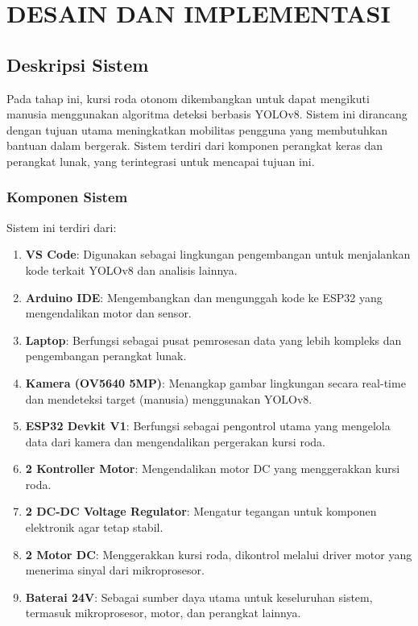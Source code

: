\chapter{DESAIN DAN IMPLEMENTASI}
\label{chap:desainimplementasi}


\section{Deskripsi Sistem}
\label{sec:deskripsisistem}

Pada tahap ini, kursi roda otonom dikembangkan untuk dapat mengikuti manusia menggunakan algoritma deteksi berbasis YOLOv8. Sistem ini dirancang dengan tujuan utama meningkatkan mobilitas pengguna yang membutuhkan bantuan dalam bergerak. Sistem terdiri dari komponen perangkat keras dan perangkat lunak, yang terintegrasi untuk mencapai tujuan ini.

\subsection{Komponen Sistem}
\label{subsec:komponensistem}

Sistem ini terdiri dari:

\begin{enumerate}[nolistsep]
    \item \textbf{VS Code}: Digunakan sebagai lingkungan pengembangan untuk menjalankan kode terkait YOLOv8 dan analisis lainnya.
    \item \textbf{Arduino IDE}: Mengembangkan dan mengunggah kode ke ESP32 yang mengendalikan motor dan sensor.
    \item \textbf{Laptop}: Berfungsi sebagai pusat pemrosesan data yang lebih kompleks dan pengembangan perangkat lunak.
    \item \textbf{Kamera (OV5640 5MP)}: Menangkap gambar lingkungan secara real-time dan mendeteksi target (manusia) menggunakan YOLOv8.
    \item \textbf{ESP32 Devkit V1}: Berfungsi sebagai pengontrol utama yang mengelola data dari kamera dan mengendalikan pergerakan kursi roda.
    \item \textbf{2 Kontroller Motor}: Mengendalikan motor DC yang menggerakkan kursi roda.
    \item \textbf{2 DC-DC Voltage Regulator}: Mengatur tegangan untuk komponen elektronik agar tetap stabil.
    \item \textbf{2 Motor DC}: Menggerakkan kursi roda, dikontrol melalui driver motor yang menerima sinyal dari mikroprosesor.
    \item \textbf{Baterai 24V}: Sebagai sumber daya utama untuk keseluruhan sistem, termasuk mikroprosesor, motor, dan perangkat lainnya.
\end{enumerate}

